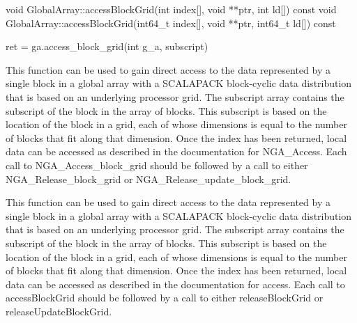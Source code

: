\documentclass[12pt]{article}
\begin{document}
\begin{cxxapi}
\begin{cxxcode}
void GlobalArray::accessBlockGrid(int index[], void **ptr, int ld[]) const
void GlobalArray::accessBlockGrid(int64_t index[], void **ptr, int64_t ld[])
                                  const
\end{cxxcode}
\begin{funcargs}
\end{funcargs}
\end{cxxapi}

\begin{pyapi}
\begin{pycode}
ret = ga.access_block_grid(int g_a, subscript)
\end{pycode}
\begin{funcargs}
\end{funcargs}
\end{pyapi}

\local

\begin{cdesc}
This function can be used to gain direct access to the data represented by a
single block in a global array with a SCALAPACK block-cyclic data distribution
that is based on an underlying processor grid. The subscript array contains the
subscript of the block in the array of blocks. This subscript is based on the
location of the block in a grid, each of whose dimensions is equal to the
number of blocks that fit along that dimension. Once the index has been
returned, local data can be accessed as described in the documentation for
NGA_Access. Each call to NGA_Access_block_grid should be followed by a call to
either NGA_Release_block_grid or NGA_Release_update_block_grid.
\end{cdesc}

\begin{cxxdesc}
This function can be used to gain direct access to the data represented by a
single block in a global array with a SCALAPACK block-cyclic data distribution
that is based on an underlying processor grid. The subscript array contains the
subscript of the block in the array of blocks. This subscript is based on the
location of the block in a grid, each of whose dimensions is equal to the
number of blocks that fit along that dimension. Once the index has been
returned, local data can be accessed as described in the documentation for
access. Each call to accessBlockGrid should be followed by a call to
either releaseBlockGrid or releaseUpdateBlockGrid.
\end{cxxdesc}
\end{document}
